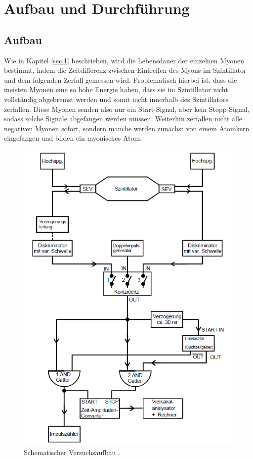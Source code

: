 \section{Aufbau und Durchführung}
\subsection{Aufbau}
Wie in Kapitel \ref{sec:1} beschrieben, wird die Lebensdauer der einzelnen Myonen bestimmt, indem die Zeitdifferenz zwischen Eintreffen
des Myons im Szintillator und dem folgenden Zerfall gemessen wird. Problematisch hierbei ist, dass die meisten Myonen eine so hohe Energie haben, dass
sie im Szintillator nicht vollständig abgebremst werden und somit nicht innerhalb des Szintillators zerfallen. Diese Myonen senden also nur ein Start-Signal,
aber kein Stopp-Signal, sodass solche Signale abgefangen werden müssen. Weiterhin zerfallen nicht alle negativen Myonen sofort, sondern manche werden zunächst von einem
Atomkern eingefangen und bilden ein myonisches Atom.

\begin{figure}[h]
  \centering
  \includegraphics[scale=0.6]{graphics/aufbau.png}
  \caption{Schematischer Versuchsaufbau \cite{anleitung}.}
  \label{fig:aufbau}
\end{figure}

